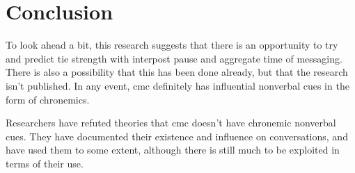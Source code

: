 \documentclass[
  stu]{apa7}
\begin{document}
\hypertarget{conclusion}{%
\section{Conclusion}\label{conclusion}}

To look ahead a bit, this research suggests that there is an opportunity
to try and predict tie strength with interpost pause and aggregate time
of messaging. There is also a possibility that this has been done
already, but that the research isn't published. In any event, cmc
definitely has influential nonverbal cues in the form of chronemics.

Researchers have refuted theories that cmc doesn't have chronemic
nonverbal cues. They have documented their existence and influence on
conversations, and have used them to some extent, although there is
still much to be exploited in terms of their use.

\printbibliography
\end{document}
